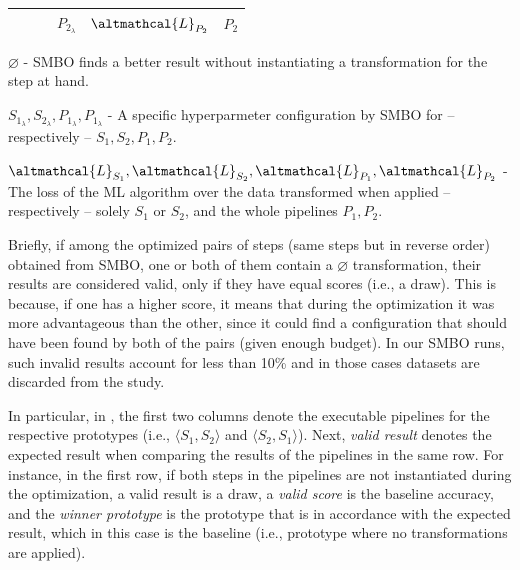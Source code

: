 \begin{table}[t]
\begin{threeparttable}
\begin{tabular}{lp{2.3cm}p{2.3cm}p{2cm}p{2cm}p{2.5cm}}
			& & & $P_{2_{\lambda}}$ & $\altmathcal{L}_{P_2}$ & $P_2$\\ \bottomrule
	\end{tabular}
	\begin{tablenotes}
	\footnotesize
	\item $\varnothing$ - SMBO finds a better result without instantiating a transformation for the step at hand.
	\item $S_{1_{\lambda}}, S_{2_{\lambda}}, P_{1_{\lambda}}, P_{1_{\lambda}}$ - A specific hyperparmeter configuration by SMBO for -- respectively -- $S_{1}, S_{2}, P_{1}, P_{2}$.
	\item $\altmathcal{L}_{S_1}, \altmathcal{L}_{S_2}, \altmathcal{L}_{P_1}, \altmathcal{L}_{P_2}$ - The loss of the ML algorithm over the data transformed when applied -- respectively -- solely $S_{1}$ or $S_{2}$, and the whole pipelines $P_{1}, P_{2}$.
	\end{tablenotes}
		\label{effective-tbl:validation-rules}
	\end{threeparttable}
\end{table}

Briefly, if among the optimized pairs of steps (same steps but in reverse order) obtained from SMBO, one or both of them contain a $\varnothing$ transformation, their results are considered valid, only if they have equal scores (i.e., a draw).
This is because, if one has a higher score, it means that during the optimization it was more advantageous than the other, since it could find a configuration that should have been found by both of the pairs (given enough budget).
In our SMBO runs, such invalid results account for less than 10\% and in those cases datasets are discarded from the study.

In particular, in , the first two columns denote the executable pipelines for the respective prototypes (i.e., $\langle S_1, S_2 \rangle$ and $\langle S_2, S_1 \rangle$).
Next, \textit{valid result} denotes the expected result when comparing the results of the pipelines in the same row.
For instance, in the first row, if both steps in the pipelines are not instantiated during the optimization, a valid result is a draw, a \textit{valid score} is the baseline accuracy, and the \textit{winner prototype} is the prototype that is in accordance with the expected result, which in this case is the baseline (i.e., prototype where no transformations are applied).

